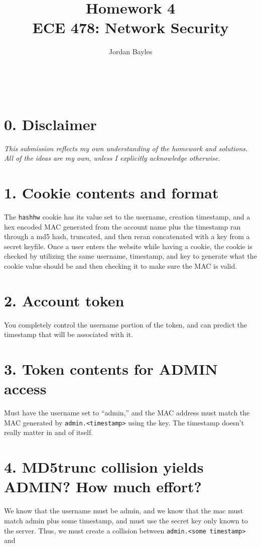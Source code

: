 \documentclass[12pt,letterpaper]{article}
\author{Jordan Bayles}
\title{Homework 4\\
\small ECE 478: Network Security}
\makeatletter
\let\thetitle\@title
\let\theauthor\@author
\let\thedate\@date
\makeatother
\begin{document}
\begin{flushright}
\theauthor\\
\thedate
\end{flushright}
\begin{center}
\thetitle
\end{center}

\section*{0. Disclaimer}
\emph{This submission reflects my own understanding of the homework and
solutions. All of the ideas are my own, unless I explicitly acknowledge otherwise.}

\section*{1. Cookie contents and format}
The \verb~hashhw~ cookie has its value set to the username, creation timestamp,
and a hex encoded MAC generated
from the account name plus the timestamp ran through a md5 hash, truncated, and
then reran concatenated with a key
from a secret keyfile. Once a user enters the website while having a cookie,
the cookie is checked by utilizing the same username, timestamp, and key
to generate what the cookie value should be and then checking it to make sure
the MAC is valid.


\section*{2. Account token}
You completely control the username portion of the token, and can predict
the timestamp that will be associated with it.

\section*{3. Token contents for ADMIN access}
Must have the username set to ``admin,'' and the MAC address must match
the MAC generated by \verb~admin.<timestamp>~ using the key. The timestamp
doesn't really matter in and of itself.

\section*{4. MD5trunc collision yields ADMIN? How much effort?}
We know that the username must be admin, and we know that the mac must match
admin plus some timestamp, and must use the secret key only known to the server.
Thus, we must create a collision between \verb~admin.<some timestamp>~ and
\end{document}
